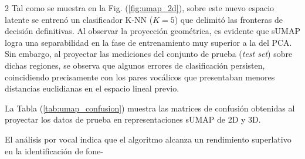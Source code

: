 \documentclass[11pt, letterpaper]{article}
\begin{document}
\begin{multicols*}{2}
Tal como se muestra en la Fig. (\ref{fig:umap_2d}), sobre este nuevo espacio latente se entrenó un clasificador K-NN ($K=5$) que delimitó las fronteras de decisión definitivas. Al observar la proyección geométrica, es evidente que sUMAP logra una separabilidad en la fase de entrenamiento muy superior a la del PCA. Sin embargo, al proyectar las mediciones del conjunto de prueba (\textit{test set}) sobre dichas regiones, se observa que algunos errores de clasificación persisten, coincidiendo precisamente con los pares vocálicos que presentaban menores distancias euclidianas en el espacio lineal previo.

La Tabla (\ref{tab:umap_confusion}) muestra las matrices de confusión obtenidas al proyectar los datos de prueba en representaciones sUMAP de 2D y 3D.

El análisis por vocal indica que el algoritmo alcanza un rendimiento superlativo en la identificación de fone-


\end{multicols*}
\end{document}
